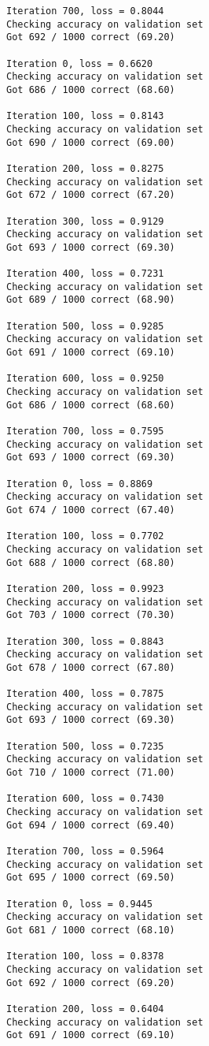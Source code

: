 \documentclass[11pt]{article}
\begin{document}
\begin{Verbatim}[commandchars=\\\{\}]
Iteration 700, loss = 0.8044
Checking accuracy on validation set
Got 692 / 1000 correct (69.20)

Iteration 0, loss = 0.6620
Checking accuracy on validation set
Got 686 / 1000 correct (68.60)

Iteration 100, loss = 0.8143
Checking accuracy on validation set
Got 690 / 1000 correct (69.00)

Iteration 200, loss = 0.8275
Checking accuracy on validation set
Got 672 / 1000 correct (67.20)

Iteration 300, loss = 0.9129
Checking accuracy on validation set
Got 693 / 1000 correct (69.30)

Iteration 400, loss = 0.7231
Checking accuracy on validation set
Got 689 / 1000 correct (68.90)

Iteration 500, loss = 0.9285
Checking accuracy on validation set
Got 691 / 1000 correct (69.10)

Iteration 600, loss = 0.9250
Checking accuracy on validation set
Got 686 / 1000 correct (68.60)

Iteration 700, loss = 0.7595
Checking accuracy on validation set
Got 693 / 1000 correct (69.30)

Iteration 0, loss = 0.8869
Checking accuracy on validation set
Got 674 / 1000 correct (67.40)

Iteration 100, loss = 0.7702
Checking accuracy on validation set
Got 688 / 1000 correct (68.80)

Iteration 200, loss = 0.9923
Checking accuracy on validation set
Got 703 / 1000 correct (70.30)

Iteration 300, loss = 0.8843
Checking accuracy on validation set
Got 678 / 1000 correct (67.80)

Iteration 400, loss = 0.7875
Checking accuracy on validation set
Got 693 / 1000 correct (69.30)

Iteration 500, loss = 0.7235
Checking accuracy on validation set
Got 710 / 1000 correct (71.00)

Iteration 600, loss = 0.7430
Checking accuracy on validation set
Got 694 / 1000 correct (69.40)

Iteration 700, loss = 0.5964
Checking accuracy on validation set
Got 695 / 1000 correct (69.50)

Iteration 0, loss = 0.9445
Checking accuracy on validation set
Got 681 / 1000 correct (68.10)

Iteration 100, loss = 0.8378
Checking accuracy on validation set
Got 692 / 1000 correct (69.20)

Iteration 200, loss = 0.6404
Checking accuracy on validation set
Got 691 / 1000 correct (69.10)


\end{Verbatim}
\end{document}

